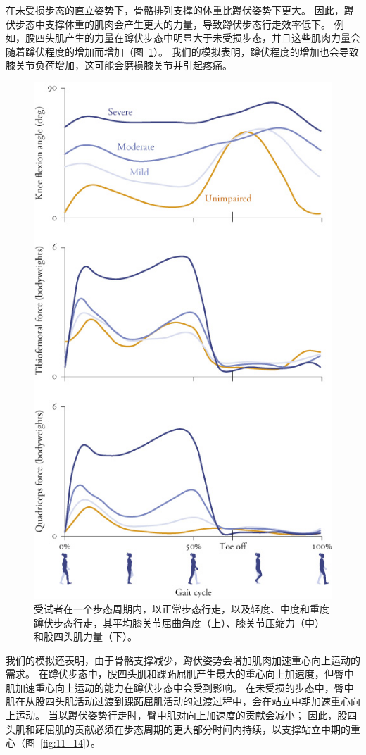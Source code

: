 在未受损步态的直立姿势下，骨骼排列支撑的体重比蹲伏姿势下更大。
因此，蹲伏步态中支撑体重的肌肉会产生更大的力量，导致蹲伏步态行走效率低下。
例如，股四头肌产生的力量在蹲伏步态中明显大于未受损步态，并且这些肌肉力量会随着蹲伏程度的增加而增加（图~\ref{fig:11_15}）。
我们的模拟表明，蹲伏程度的增加也会导致膝关节负荷增加，这可能会磨损膝关节并引起疼痛。


\begin{figure}[!htb]
	\centering
	\includegraphics[width=0.8\linewidth]{chap11/11_15}
	\caption{受试者在一个步态周期内，以正常步态行走，以及轻度、中度和重度蹲伏步态行走，其平均膝关节屈曲角度（上）、膝关节压缩力（中）和股四头肌力量（下）\cite{steele2012compressive}。 \label{fig:11_15}}
\end{figure}


我们的模拟还表明，由于骨骼支撑减少，蹲伏姿势会增加肌肉加速重心向上运动的需求。
在蹲伏步态中，股四头肌和踝跖屈肌产生最大的重心向上加速度，但臀中肌加速重心向上运动的能力在蹲伏步态中会受到影响。
在未受损的步态中，臀中肌在从股四头肌活动过渡到踝跖屈肌活动的过渡过程中，会在站立中期加速重心向上运动。
当以蹲伏姿势行走时，臀中肌对向上加速度的贡献会减小；
因此，股四头肌和跖屈肌的贡献必须在步态周期的更大部分时间内持续，以支撑站立中期的重心（图~\ref{fig:11_14}）。


